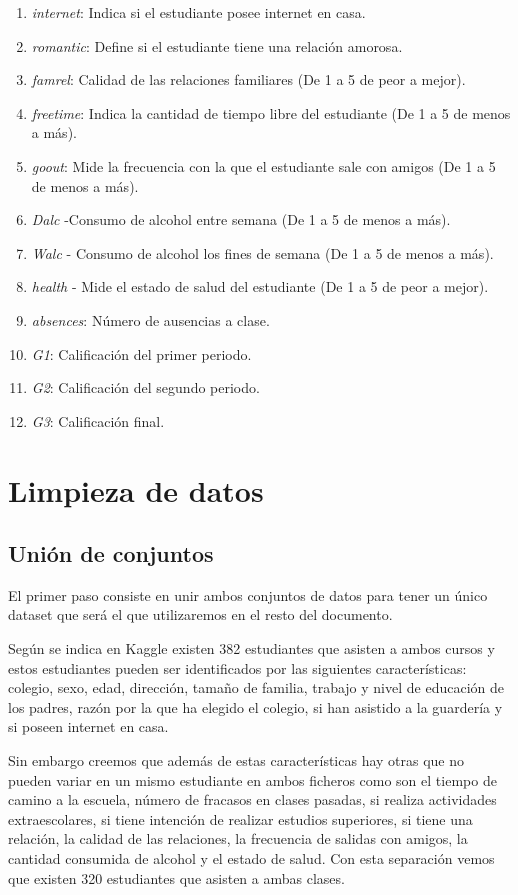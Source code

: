 \documentclass[12pt,a4paper]{article}
\begin{document}
\begin{enumerate}
	\item \textit{internet}: Indica si el estudiante posee internet en casa.
	\item \textit{romantic}: Define si el estudiante tiene una relación amorosa. 
	\item \textit{famrel}: Calidad de las relaciones familiares (De 1 a 5 de peor a mejor).
	\item \textit{freetime}: Indica la cantidad de tiempo libre del estudiante (De 1 a 5 de menos a más).
	\item \textit{goout}: Mide la frecuencia con la que el estudiante sale con amigos (De 1 a 5 de menos a más).
	\item \textit{Dalc} -Consumo de alcohol entre semana (De 1 a 5 de menos a más).
	\item \textit{Walc} - Consumo de alcohol los fines de semana (De 1 a 5 de menos a más).
	\item \textit{health} - Mide el estado de salud del estudiante (De 1 a 5 de peor a mejor).
	\item \textit{absences}: Número de ausencias a clase.
	\item \textit{G1}: Calificación del primer periodo.
	\item \textit{G2}: Calificación del segundo periodo.
	\item \textit{G3}: Calificación final.
\end{enumerate}




\section{Limpieza de datos}
\subsection{Unión de conjuntos}
El primer paso consiste en unir ambos conjuntos de datos para tener un único dataset que será el que utilizaremos en el resto del documento. 

Según se indica en Kaggle existen 382 estudiantes que asisten a ambos cursos y estos estudiantes pueden ser identificados por las siguientes características: colegio, sexo, edad, dirección, tamaño de familia, trabajo y nivel de educación de los padres, razón por la que ha elegido el colegio, si han asistido a la guardería y si poseen internet en casa. 

Sin embargo creemos que además de estas características hay otras que no pueden variar en un mismo estudiante en ambos ficheros como son el tiempo de camino a la escuela, número de fracasos en clases pasadas, si realiza actividades extraescolares, si tiene intención de realizar estudios superiores, si tiene una relación, la calidad de las relaciones, la frecuencia de salidas con amigos, la cantidad consumida de alcohol y el estado de salud. Con esta separación vemos que existen 320 estudiantes que asisten a ambas clases. 
\end{document}
